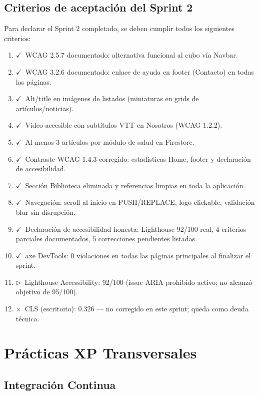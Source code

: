 \documentclass[12pt, a4paper]{article}
\newcommand{\cmark}{\textcolor{successgreen}{$\checkmark$}}
\newcommand{\xmark}{\textcolor{errored}{$\times$}}
\newcommand{\wmark}{\textcolor{warningyellow}{$\triangleright$}}
\begin{document}
\subsection{Criterios de aceptación del Sprint 2}

Para declarar el Sprint 2 completado, se deben cumplir todos los siguientes criterios:

\begin{enumerate}
  \item \cmark~WCAG 2.5.7 documentado: alternativa funcional al cubo vía Navbar.
  \item \cmark~WCAG 3.2.6 documentado: enlace de ayuda en footer (Contacto) en todas las páginas.
  \item \cmark~Alt/title en imágenes de listados (miniaturas en grids de artículos/noticias).
  \item \cmark~Vídeo accesible con subtítulos VTT en Nosotros (WCAG 1.2.2).
  \item \cmark~Al menos 3 artículos por módulo de salud en Firestore.
  \item \cmark~Contraste WCAG 1.4.3 corregido: estadísticas Home, footer y declaración de accesibilidad.
  \item \cmark~Sección Biblioteca eliminada y referencias limpias en toda la aplicación.
  \item \cmark~Navegación: scroll al inicio en PUSH/REPLACE, logo clickable, validación blur sin disrupción.
  \item \cmark~Declaración de accesibilidad honesta: Lighthouse 92/100 real, 4 criterios parciales documentados, 5 correcciones pendientes listadas.
  \item \cmark~axe DevTools: 0 violaciones en todas las páginas principales al finalizar el sprint.
  \item \wmark~Lighthouse Accessibility: 92/100 (issue ARIA prohibido activo; no alcanzó objetivo de 95/100).
  \item \xmark~CLS (escritorio): 0.326 --- no corregido en este sprint; queda como deuda técnica.
\end{enumerate}

\section{Prácticas XP Transversales}

\subsection{Integración Continua}
\end{document}
